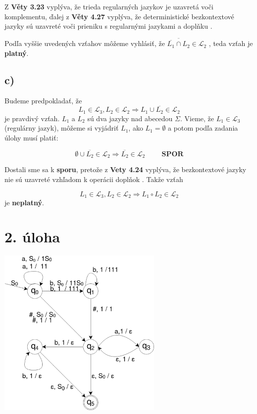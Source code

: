 \documentclass[11pt,a4paper]{article}
\begin{document}
Z \textbf{Věty 3.23} vyplýva, že trieda regularných jazykov je uzavretá voči komplementu, ďalej z \textbf{Věty 4.27} vyplýva, že deterministické bezkontextové jazyky sú uzavreté voči prieniku s regularnými jazykami a doplňku \cite{AA}.


Podľa vyššie uvedených vzťahov môžeme vyhlásiť, že $\overline{\overline{L_1} \cap L_2} \in \mathcal{L}_2$ , teda vzťah je \textbf{platný}.










\subsection{c)}

Budeme predpokladať, že
\begin{equation}
    L_1 \in \mathcal{L}_3, L_2 \in \mathcal{L}_2 \Rightarrow L_1 \cup \overline{L_2} \in \mathcal{L}_2
\end{equation}
je pravdivý vzťah. $L_1$ a $L_2$ sú dva jazyky nad abecedou $\Sigma$. Vieme, že $L_1 \in \mathcal{L}_3$(regulárny jazyk), môžeme si vyjádriť $L_1$, ako $L_1 = \emptyset$ a potom podľa zadania úlohy musí platiť:

\begin{equation}
\emptyset \cup \overline{L_2} \in \mathcal{L}_2 \Rightarrow \overline{L_2} \in \mathcal{L}_2 \hspace{1cm}\textbf{SPOR}
\end{equation}

Dostali sme sa k \textbf{sporu}, pretože z \textbf{Vety 4.24} vyplýva, že bezkontextové jazyky nie sú uzavreté vzhľadom k operácii doplňok \cite{AA}. Takže vzťah

\begin{equation}
L_1 \in \mathcal{L}_3, L_2 \in \mathcal{L}_2 \Rightarrow L_1 \circ L_2 \in \mathcal{L}_2
\end{equation}
je \textbf{neplatný}.

\newpage
\section{2. úloha}

\begin{center}
    \includegraphics[width=0.6\textwidth]{QFSMpng.eps}
\end{center}
\end{document}
